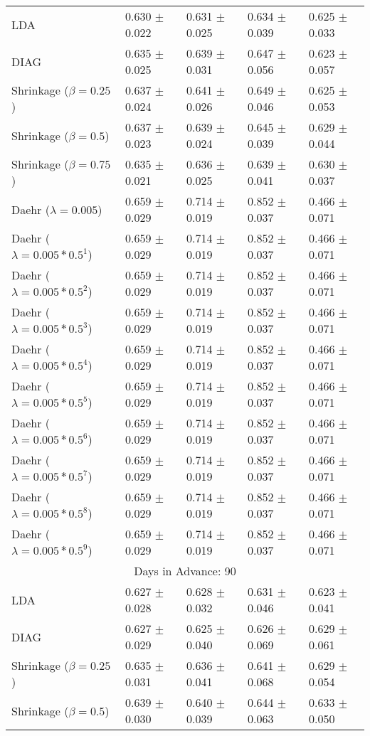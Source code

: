 \begin{table}
\begin{tabular}{*{5}{l}}
LDA&0.630 $\pm$ 0.022&0.631 $\pm$ 0.025&0.634 $\pm$ 0.039&0.625 $\pm$ 0.033\\
DIAG&0.635 $\pm$ 0.025&0.639 $\pm$ 0.031&0.647 $\pm$ 0.056&0.623 $\pm$ 0.057\\
Shrinkage ($\beta=0.25$)&0.637 $\pm$ 0.024&0.641 $\pm$ 0.026&0.649 $\pm$ 0.046&0.625 $\pm$ 0.053\\
Shrinkage ($\beta=0.5$)&0.637 $\pm$ 0.023&0.639 $\pm$ 0.024&0.645 $\pm$ 0.039&0.629 $\pm$ 0.044\\
Shrinkage ($\beta=0.75$)&0.635 $\pm$ 0.021&0.636 $\pm$ 0.025&0.639 $\pm$ 0.041&0.630 $\pm$ 0.037\\
Daehr ($\lambda=0.005$)&0.659 $\pm$ 0.029&0.714 $\pm$ 0.019&0.852 $\pm$ 0.037&0.466 $\pm$ 0.071\\
Daehr ($\lambda=0.005*0.5^1$)&0.659 $\pm$ 0.029&0.714 $\pm$ 0.019&0.852 $\pm$ 0.037&0.466 $\pm$ 0.071\\
Daehr ($\lambda=0.005*0.5^2$)&0.659 $\pm$ 0.029&0.714 $\pm$ 0.019&0.852 $\pm$ 0.037&0.466 $\pm$ 0.071\\
Daehr ($\lambda=0.005*0.5^3$)&0.659 $\pm$ 0.029&0.714 $\pm$ 0.019&0.852 $\pm$ 0.037&0.466 $\pm$ 0.071\\
Daehr ($\lambda=0.005*0.5^4$)&0.659 $\pm$ 0.029&0.714 $\pm$ 0.019&0.852 $\pm$ 0.037&0.466 $\pm$ 0.071\\
Daehr ($\lambda=0.005*0.5^5$)&0.659 $\pm$ 0.029&0.714 $\pm$ 0.019&0.852 $\pm$ 0.037&0.466 $\pm$ 0.071\\
Daehr ($\lambda=0.005*0.5^6$)&0.659 $\pm$ 0.029&0.714 $\pm$ 0.019&0.852 $\pm$ 0.037&0.466 $\pm$ 0.071\\
Daehr ($\lambda=0.005*0.5^7$)&0.659 $\pm$ 0.029&0.714 $\pm$ 0.019&0.852 $\pm$ 0.037&0.466 $\pm$ 0.071\\
Daehr ($\lambda=0.005*0.5^8$)&0.659 $\pm$ 0.029&0.714 $\pm$ 0.019&0.852 $\pm$ 0.037&0.466 $\pm$ 0.071\\
Daehr ($\lambda=0.005*0.5^9$)&0.659 $\pm$ 0.029&0.714 $\pm$ 0.019&0.852 $\pm$ 0.037&0.466 $\pm$ 0.071\\
\hline\multicolumn{5}{c}{  Days in Advance: 90}\\\hline
LDA&0.627 $\pm$ 0.028&0.628 $\pm$ 0.032&0.631 $\pm$ 0.046&0.623 $\pm$ 0.041\\
DIAG&0.627 $\pm$ 0.029&0.625 $\pm$ 0.040&0.626 $\pm$ 0.069&0.629 $\pm$ 0.061\\
Shrinkage ($\beta=0.25$)&0.635 $\pm$ 0.031&0.636 $\pm$ 0.041&0.641 $\pm$ 0.068&0.629 $\pm$ 0.054\\
Shrinkage ($\beta=0.5$)&0.639 $\pm$ 0.030&0.640 $\pm$ 0.039&0.644 $\pm$ 0.063&0.633 $\pm$ 0.050\\

\end{tabular}
\end{table}
